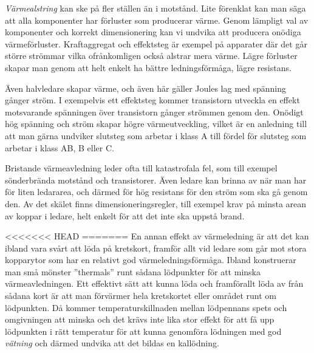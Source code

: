 \emph{Värmealstring} kan ske på fler ställen än i motstånd. Lite förenklat
kan man säga att alla komponenter har förluster som producerar värme. Genom
lämpligt val av komponenter och korrekt dimensionering kan vi undvika att
producera onödiga värmeförluster. Kraftaggregat och effektsteg är exempel
på apparater där det går större strömmar vilka ofrånkomligen också alstrar
mera värme. Lägre förluster skapar man genom att helt enkelt ha bättre
ledningsförmåga, lägre resistans.


Även halvledare skapar värme, och även här gäller Joules lag med spänning
gånger ström. I exempelvis ett effektsteg kommer transistorn utveckla en
effekt motsvarande spänningen över transistorn gånger strömmen genom den. 
Onödigt hög spänning och ström skapar högre värmeutveckling, vilket är en 
anledning till att man gärna undviker slutsteg som arbetar i klass A till fördel för
slutsteg som arbetar i klass AB, B eller C.

Bristande värmeavledning leder ofta till katastrofala fel, som till exempel
sönderbrända motstånd och transistorer. Även ledare kan brinna av när man
har för liten ledararea, och därmed för hög resistans för den ström som
ska gå genom den. Av det skälet finns dimensioneringsregler, till exempel
krav på minsta arean av koppar i ledare, helt enkelt för att det inte ska
uppstå brand.

<<<<<<< HEAD
=======
En annan effekt av värmeledning är att det kan ibland vara svårt att löda
på kretskort, framför allt vid ledare som går mot stora kopparytor som
har en relativt god värmeledningsförmåga. Ibland konstruerar man små mönster
''thermals'' runt sådana lödpunkter för att minska värmeavledningen.
Ett effektivt sätt att kunna löda och framförallt löda av från sådana
kort är att man förvärmer hela kretskortet eller området runt om
lödpunkten. Då kommer temperaturskillnaden mellan lödpennans spets och
omgivningen att minska och det krävs inte lika stor effekt för att få
upp lödpunkten i rätt temperatur för att kunna genomföra lödningen med god
\emph{vätning} och därmed undvika att det bildas en kallödning.

